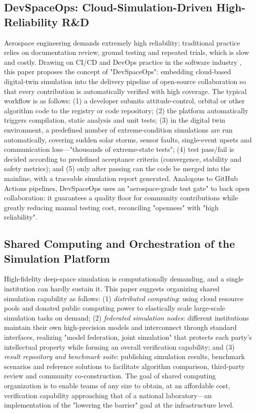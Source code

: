 \documentclass[11pt]{article}
\begin{document}
\subsection{DevSpaceOps: Cloud-Simulation-Driven High-Reliability R\&D}
Aerospace engineering demands extremely high reliability; traditional practice relies on documentation review, ground testing and repeated trials, which is slow and costly. Drawing on CI/CD and DevOps practice in the software industry \cite{devops2016}, this paper proposes the concept of "DevSpaceOps": embedding cloud-based digital-twin simulation into the delivery pipeline of open-source collaboration so that every contribution is automatically verified with high coverage. The typical workflow is as follows: (1) a developer submits attitude-control, orbital or other algorithm code to the registry or code repository; (2) the platform automatically triggers compilation, static analysis and unit tests; (3) in the digital twin environment, a predefined number of extreme-condition simulations are run automatically, covering sudden solar storms, sensor faults, single-event upsets and communication loss---"thousands of extreme-state tests"; (4) test pass/fail is decided according to predefined acceptance criteria (convergence, stability and safety metrics); and (5) only after passing can the code be merged into the mainline, with a traceable simulation report generated. Analogous to GitHub Actions pipelines, DevSpaceOps uses an "aerospace-grade test gate" to back open collaboration: it guarantees a quality floor for community contributions while greatly reducing manual testing cost, reconciling "openness" with "high reliability".

\subsection{Shared Computing and Orchestration of the Simulation Platform}
High-fidelity deep-space simulation is computationally demanding, and a single institution can hardly sustain it. This paper suggests organizing shared simulation capability as follows: (1) \emph{distributed computing}: using cloud resource pools and donated public computing power to elastically scale large-scale simulation tasks on demand; (2) \emph{federated simulation nodes}: different institutions maintain their own high-precision models and interconnect through standard interfaces, realizing "model federation, joint simulation" that protects each party's intellectual property while forming an overall verification capability; and (3) \emph{result repository and benchmark suite}: publishing simulation results, benchmark scenarios and reference solutions to facilitate algorithm comparison, third-party review and community co-construction. The goal of shared computing organization is to enable teams of any size to obtain, at an affordable cost, verification capability approaching that of a national laboratory---an implementation of the "lowering the barrier" goal at the infrastructure level.
\end{document}
